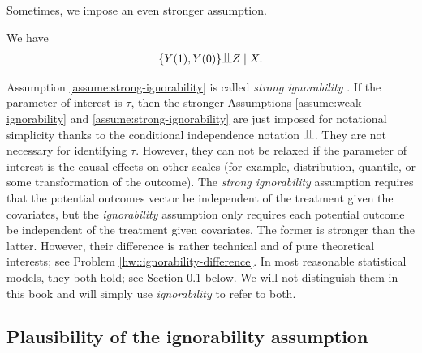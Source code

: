 Sometimes, we impose an even stronger assumption.

\begin{assumption}
\label{assume:strong-ignorability}
We have 
\begin{eqnarray}
 \{  Y(1), Y(0)  \} \ind Z \mid X .
  \label{eq::strong-ignorability}
\end{eqnarray}
\end{assumption}


Assumption \ref{assume:strong-ignorability}  is called {\it strong ignorability} \citep{rubin1978bayesian, rosenbaum1983central}. If the parameter of interest is $\tau$, then the stronger Assumptions \ref{assume:weak-ignorability} and \ref{assume:strong-ignorability} are just imposed for notational simplicity thanks to the conditional independence notation $\ind$. They are not necessary for identifying $\tau$. However,  they can not be relaxed if the parameter of interest is the causal effects on other scales (for example, distribution, quantile, or some transformation of the outcome). 
The  {\it strong ignorability} assumption requires that the potential outcomes vector be independent of the treatment given the covariates, but the {\it ignorability} assumption only requires each potential outcome be independent of the treatment given covariates. The former is stronger than the latter. However, their difference is rather technical and of pure theoretical interests; see Problem \ref{hw::ignorability-difference}. In most reasonable statistical models, they both hold; see Section \ref{sec::plausibility-ignorability} below. We will not distinguish them in this book and will simply use {\it ignorability} to refer to both. 
 
 
 
 
 
 \subsection{Plausibility of the ignorability assumption} \label{sec::plausibility-ignorability}



